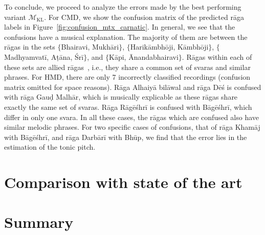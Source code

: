 

To conclude, we proceed to analyze the errors made by the best performing variant $\mathcal{M}_{\mathrm{KL}}$. For  CMD, we show the confusion matrix of the predicted r\={a}ga labels in Figure~\ref{fig:confusion_mtx_carnatic}. In general, we see that the confusions have a musical explanation. The majority of them are between the r\={a}gas in the sets $\lbrace$Bhairavi, Mukh\={a}ri$\rbrace$, $\lbrace$Harik\={a}mbh\={o}ji, K\={a}mbh\={o}ji$\rbrace$, $\lbrace$Madhyamvat\={i}, A\d{t}\={a}na, \'Sr\={i}$\rbrace$, and $\lbrace$K\={a}pi, \={A}nandabhairavi$\rbrace$. R\={a}gas within each of these sets are allied r\={a}gas~\cite{Viswanathan2004}, i.e., they share a common set of svaras and similar phrases. For HMD, there are only 7 incorrectly classified recordings (confusion matrix omitted for space reasons). R\={a}ga Alhaiy\={a} bil\={a}wal and r\={a}ga D\={e}\'{s} is confused with r\={a}ga Gau\d{d} Malh\={a}r, which is musically explicable as these r\={a}gas share exactly the same set of svaras. R\={a}ga R\={a}g\={e}\'{s}hr\={i} is confused with B\={a}g\={e}\'{s}hr\={i}, which differ in only one svara. In all these cases, the r\={a}gas which are confused also have similar melodic phrases. For two specific cases of confusions, that of r\={a}ga  Kham\={a}j with B\={a}g\={e}\'{s}hr\={i}, and r\={a}ga Darb\={a}r\={i} with Bh\={u}p, we find that the error lies in the estimation of the tonic pitch.


\section{Comparison with state of the art}
\label{sec:summary_raga_recognition}

\section{Summary}
\label{sec:summary_raga_recognition}




